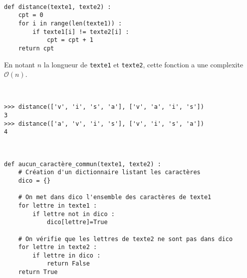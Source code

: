 \ifprof
\begin{corrige}~\\ 
\vspace{-.5cm}
\begin{lstlisting}
def distance(texte1, texte2) :
    cpt = 0
    for i in range(len(texte1)) : 
        if texte1[i] != texte2[i] :
            cpt = cpt + 1
    return cpt
\end{lstlisting}
En notant $n$ la longueur de \lstinline{texte1} et \lstinline{texte2}, cette fonction a une complexite $\mathcal{O}(n)$.
\end{corrige}
\else
\fi

\begin{exemple}~\\ 
\vspace{-.5cm}
\begin{lstlisting}
>>> distance(['v', 'i', 's', 'a'], ['v', 'a', 'i', 's'])
3
>>> distance(['a', 'v', 'i', 's'], ['v', 'i', 's', 'a'])
4
\end{lstlisting}
\end{exemple}

\ifprof
\begin{corrige}~\\ 
\vspace{-.5cm}
\begin{lstlisting}
def aucun_caractère_commun(texte1, texte2) :
    # Création d'un dictionnaire listant les caractères
    dico = {}

    # On met dans dico l'ensemble des caractères de texte1
    for lettre in texte1 : 
        if lettre not in dico : 
            dico[lettre]=True
    
    # On vérifie que les lettres de texte2 ne sont pas dans dico
    for lettre in texte2 : 
        if lettre in dico : 
            return False
    return True
            
\end{lstlisting}
\end{corrige}
\else
\fi


